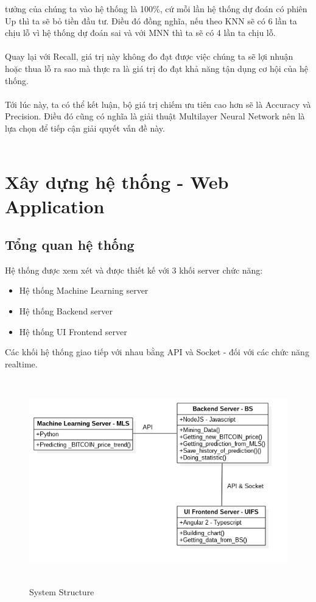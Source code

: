 tưởng của chúng ta vào hệ thống là 100\%, cứ mỗi lần hệ thống dự đoán có phiên Up 
thì ta sẽ bỏ tiền đầu tư. Điều đó đồng nghĩa, nếu theo KNN sẽ có 6 lần ta chịu 
lỗ vì hệ thống dự đoán sai và với MNN thì ta sẽ có 4 lần ta chịu lỗ.\\\\
Quay lại với Recall, giá trị này không đo đạt được việc chúng ta sẽ lợi nhuận 
hoặc thua lỗ ra sao mà thực ra là giá trị đo đạt khả năng tận dụng cơ hội của hệ 
thống.\\\\
Tới lúc này, ta có thể kết luận, bộ giá trị chiếm ưu tiên cao hơn sẽ là Accuracy 
và Precision. Điều đó cũng có nghĩa là giải thuật Multilayer Neural Network nên 
là lựa chọn để tiếp cận giải quyết vấn đề này.\\\\

\section{Xây dựng hệ thống - Web Application}
\subsection{Tổng quan hệ thống}
Hệ thống được xem xét và được thiết kế với 3 khối server chức năng:
\begin{itemize}
\item Hệ thống Machine Learning server
\item Hệ thống Backend server
\item Hệ thống UI Frontend server
\end{itemize}
Các khối hệ thống giao tiếp với nhau bằng API và Socket - đối với các chức năng
realtime.\\
\begin{figure}[h!]
\centering
\includegraphics[height=3.5in, keepaspectratio=true]{system.png}
\caption{System Structure}
\end{figure}\\

